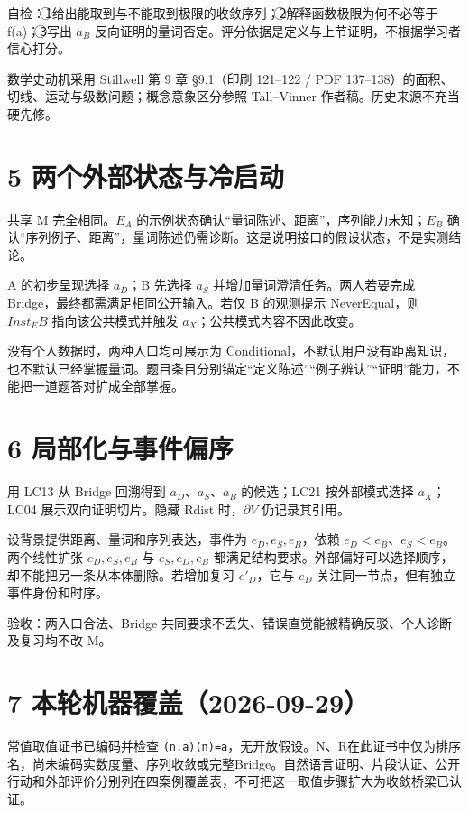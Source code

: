 \documentclass[UTF8,a4paper,zihao=-4,fontset=windows,openany]{ctexbook}
\newcommand{\mcsnum}[1]{\textcircled{\scriptsize #1}}
\def\ensuremath#1{#1}%
\def\mathrm#1{#1}%
\newcommand{\mcsbrk}{\penalty 200\relax}
\begin{document}
自检：\mcsnum{1}给出能取到与不能取到极限的收敛序列；\mcsnum{2}解释函数极限为何不必等于 f(a)；\mcsnum{3}写出 \(a_B\) 反向证明的量词否定。评分依据是定义与上节证明，不根据学习者信心打分。

数学史动机采用 Stillwell 第 9 章 §9.1（印刷 121–122 / PDF 137–138）的面积、切线、运动与级数问题；概念意象区分参照 Tall–Vinner 作者稿。历史来源不充当硬先修。

\section{5 两个外部状态与冷启动}
共享 M 完全相同。\(E_A\) 的示例状态确认“量词陈述、距离”，序列能力未知；\(E_B\) 确认“序列例子、距离”，量词陈述仍需诊断。这是说明接口的假设状态，不是实测结论。

A 的初步呈现选择 \(a_D\)；B 先选择 \(a_S\) 并增加量词澄清任务。两人若要完成 Bridge，最终都需满足相同公开输入。若仅 B 的观测提示 NeverEqual，则 \(\mathrm{Inst}_\mathrm{EB}\) 指向该公共模式并触发 \(a_X\)；公共模式内容不因此改变。

没有个人数据时，两种入口均可展示为 Conditional，不默认用户没有距离知识，也不默认已经掌握量词。题目条目分别锚定“定义陈述”“例子辨认”“证明”能力，不能把一道题答对扩成全部掌握。

\section{6 局部化与事件偏序}
用 LC13 从 Bridge 回溯得到 \(a_D\)、\(a_S\)、\(a_B\) 的候选；LC21 按外部模式选择 \(a_X\)；LC04 展示双向证明切片。隐藏 Rdist 时，\(\partial V\) 仍记录其引用。

设背景提供距离、量词和序列表达，事件为 \(e_D,e_S,e_B\)，依赖 \(e_D<e_B\)、\(e_S<e_B\)。两个线性扩张 \(e_D,e_S,e_B\) 与 \(e_S,e_D,e_B\) 都满足结构要求。外部偏好可以选择顺序，却不能把另一条从本体删除。若增加复习 \(e'_D\)，它与 \(e_D\) 关注同一节点，但有独立事件身份和时序。

验收：两入口合法、Bridge 共同要求不丢失、错误直觉能被精确反驳、个人诊断及复习均不改 M。

\section{7 本轮机器覆盖（2026-09-29）}
常值取值证书已编码并检查 \texttt{(\ensuremath{\lambda}n.\mcsbrk{}a)(n)=a}，无开放假设。N、R在此证书中仅为排序名，尚未编码实数度量、序列收敛或完整Bridge。自然语言证明、片段认证、公开行动和外部评价分别列在四案例覆盖表，不可把这一取值步骤扩大为收敛桥梁已认证。
\end{document}
